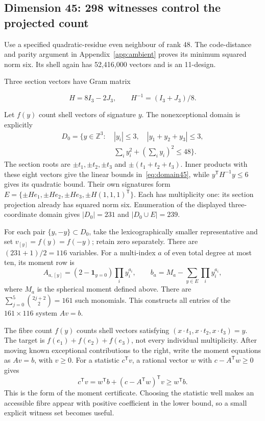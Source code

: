 \subsection{Dimension 45: 298 witnesses control the projected count}

Use a specified quadratic-residue even neighbour of rank 48. The
code-distance and parity argument in Appendix~\ref{app:ambient} proves its minimum squared norm
six. Its shell again has 52,416,000 vectors and is an 11-design.

Three section vectors have Gram matrix

\[
H=8I_3-2J_3,\qquad H^{-1}=(I_3+J_3)/8.
\]

Let $f(y)$ count shell vectors of signature $y$. The nonexceptional
domain is explicitly
\begin{equation}
\begin{split}
D_0=\{y\in\mathbb Z^3:\ &|y_i|\le3,\quad |y_1+y_2+y_3|\le3,\\
&\textstyle\sum_i y_i^2+(\sum_i y_i)^2\le48\}.
\end{split}
\label{eq:domain45}
\end{equation}
The section roots are $\pm t_1,\pm t_2,\pm t_3$ and
$\pm(t_1+t_2+t_3)$. Inner products with these eight vectors give the
linear bounds in~\eqref{eq:domain45}, while $y^{\mathsf T}H^{-1}y\le6$
gives its quadratic bound. Their own signatures form
$E=\{\pm He_1,\pm He_2,\pm He_3,\pm H(1,1,1)^{\mathsf T}\}$.
Each has multiplicity one: its section projection already has squared
norm six. Enumeration of the displayed three-coordinate domain gives
$|D_0|=231$ and $|D_0\cup E|=239$.

For each pair $\{y,-y\}\subset D_0$, take the lexicographically smaller
representative and set $v_{[y]}=f(y)=f(-y)$; retain zero separately.
There are $(231+1)/2=116$ variables. For a multi-index $a$ of even
total degree at most ten, its moment row is
\[
A_{a,[y]}=(2-\mathbf1_{y=0})\prod_i y_i^{a_i},\qquad
b_a=M_a-\sum_{y\in E}\prod_i y_i^{a_i},
\]
where $M_a$ is the spherical moment defined above. There are
$\sum_{j=0}^5\binom{2j+2}{2}=161$ such monomials. This constructs all
entries of the $161\times116$ system $Av=b$.

The fibre count $f(y)$ counts shell vectors satisfying
$(x\cdot t_1,x\cdot t_2,x\cdot t_3)=y$.
The target is $f(e_1)+f(e_2)+f(e_3)$, not every individual multiplicity.
After moving known exceptional contributions to the right, write the
moment equations as $Av=b$, with $v\ge0$. For a statistic
$c^{\mathsf T}v$, a rational vector $w$ with $c-A^{\mathsf T}w\ge0$ gives
\[
c^{\mathsf T}v=w^{\mathsf T}b+(c-A^{\mathsf T}w)^{\mathsf T}v
\ge w^{\mathsf T}b.
\]
This is the form of the moment certificate. Choosing the statistic well
makes an accessible fibre appear with positive coefficient in the lower
bound, so a small explicit witness set becomes useful.


